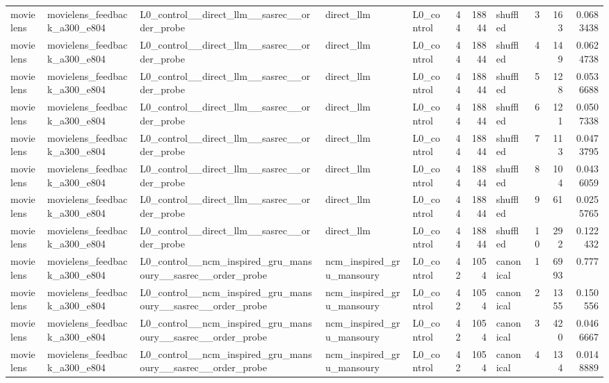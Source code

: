 \begin{table}[htbp!]
\begin{tabular}{lllllrrlrrr}
movielens & movielens\_feedback\_a300\_e804 & L0\_control\_\_direct\_llm\_\_sasrec\_\_order\_probe & direct\_llm & L0\_control & 44 & 18844 & shuffled & 3 & 163 & 0.0683438 \\
movielens & movielens\_feedback\_a300\_e804 & L0\_control\_\_direct\_llm\_\_sasrec\_\_order\_probe & direct\_llm & L0\_control & 44 & 18844 & shuffled & 4 & 149 & 0.0624738 \\
movielens & movielens\_feedback\_a300\_e804 & L0\_control\_\_direct\_llm\_\_sasrec\_\_order\_probe & direct\_llm & L0\_control & 44 & 18844 & shuffled & 5 & 128 & 0.0536688 \\
movielens & movielens\_feedback\_a300\_e804 & L0\_control\_\_direct\_llm\_\_sasrec\_\_order\_probe & direct\_llm & L0\_control & 44 & 18844 & shuffled & 6 & 121 & 0.0507338 \\
movielens & movielens\_feedback\_a300\_e804 & L0\_control\_\_direct\_llm\_\_sasrec\_\_order\_probe & direct\_llm & L0\_control & 44 & 18844 & shuffled & 7 & 113 & 0.0473795 \\
movielens & movielens\_feedback\_a300\_e804 & L0\_control\_\_direct\_llm\_\_sasrec\_\_order\_probe & direct\_llm & L0\_control & 44 & 18844 & shuffled & 8 & 104 & 0.0436059 \\
movielens & movielens\_feedback\_a300\_e804 & L0\_control\_\_direct\_llm\_\_sasrec\_\_order\_probe & direct\_llm & L0\_control & 44 & 18844 & shuffled & 9 & 61 & 0.0255765 \\
movielens & movielens\_feedback\_a300\_e804 & L0\_control\_\_direct\_llm\_\_sasrec\_\_order\_probe & direct\_llm & L0\_control & 44 & 18844 & shuffled & 10 & 292 & 0.122432 \\
movielens & movielens\_feedback\_a300\_e804 & L0\_control\_\_ncm\_inspired\_gru\_mansoury\_\_sasrec\_\_order\_probe & ncm\_inspired\_gru\_mansoury & L0\_control & 42 & 1054 & canonical & 1 & 6993 & 0.777 \\
movielens & movielens\_feedback\_a300\_e804 & L0\_control\_\_ncm\_inspired\_gru\_mansoury\_\_sasrec\_\_order\_probe & ncm\_inspired\_gru\_mansoury & L0\_control & 42 & 1054 & canonical & 2 & 1355 & 0.150556 \\
movielens & movielens\_feedback\_a300\_e804 & L0\_control\_\_ncm\_inspired\_gru\_mansoury\_\_sasrec\_\_order\_probe & ncm\_inspired\_gru\_mansoury & L0\_control & 42 & 1054 & canonical & 3 & 420 & 0.0466667 \\
movielens & movielens\_feedback\_a300\_e804 & L0\_control\_\_ncm\_inspired\_gru\_mansoury\_\_sasrec\_\_order\_probe & ncm\_inspired\_gru\_mansoury & L0\_control & 42 & 1054 & canonical & 4 & 134 & 0.0148889 \\

\end{tabular}
\end{table}
